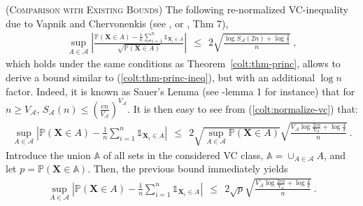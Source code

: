 \begin{remark} (\textsc{Comparison with Existing Bounds})
The following re-normalized VC-inequality due to Vapnik and Chervonenkis (see \cite{Vapnik74}, \cite{Anthony93} or \cite{Bousquet04}, Thm 7),
\begin{align} \label{colt:normalize-vc}
\sup_{A \in \mathcal{A}} \left| \frac{ \mathbb{P} (\mathbf{X} \in A) - \frac{1}{n} \sum_{i=1}^n \mathds{1}_{\mathbf{X}_i \in A}  }{\sqrt{\mathbb{P}(\mathbf{X} \in A)}} \right| ~~\le~~ 2 \sqrt{\frac{\log{S_{\mathcal{A}}(2n)}+\log{\frac{4}{\delta}}}{n}}~,
\end{align}
which holds under the same conditions as Theorem~\ref{colt:thm-princ}, allows to derive a bound similar to (\ref{colt:thm-princ-ineq}), but with an additional $\log n$ factor.
Indeed, it is known as Sauer's Lemma (see \cite{Bousquet04}-lemma 1 for instance) that for $n \ge V_{\mathcal{A}}$, $S_{\mathcal{A}}(n) \le (\frac{en}{V_{\mathcal{A}}})^{V_{\mathcal{A}}}$. It is then easy to see from (\ref{colt:normalize-vc}) that:
\begin{align*}
\sup_{A \in \mathcal{A}} \left | \mathbb{P} (\mathbf{X} \in A) - \frac{1}{n} \sum_{i=1}^n \mathds{1}_{\mathbf{X}_i \in A}  \right| ~~\le~~ 2 \sqrt{\sup_{A \in \mathcal{A}}\mathbb{P}(\mathbf{X} \in A)}  \sqrt{\frac{V_{\mathcal{A}}\log{\frac{2en}{V_{\mathcal{A}}}}+\log{\frac{4}{\delta}}}{n}}~.
\end{align*}
Introduce the union $\mathbb{A}$ of all sets  in the  considered VC
class, $\mathbb{A} = \cup_{A \in \mathcal{A}} A$, and let $p =
\mathbb{P}\left ( \mathbf{X} \in \mathbb{A}\right)$. Then, the  previous bound immediately yields 
\begin{align*}
\sup_{A \in \mathcal{A}} \left | \mathbb{P} (\mathbf{X} \in A) - \frac{1}{n} \sum_{i=1}^n \mathds{1}_{\mathbf{X}_i \in A}  \right| ~~\le~~ 2\sqrt p  \sqrt{\frac{V_{\mathcal{A}}\log{\frac{2en}{V_{\mathcal{A}}}}+\log{\frac{4}{\delta}}}{n}}~.
\end{align*}

\end{remark}



\noindent




